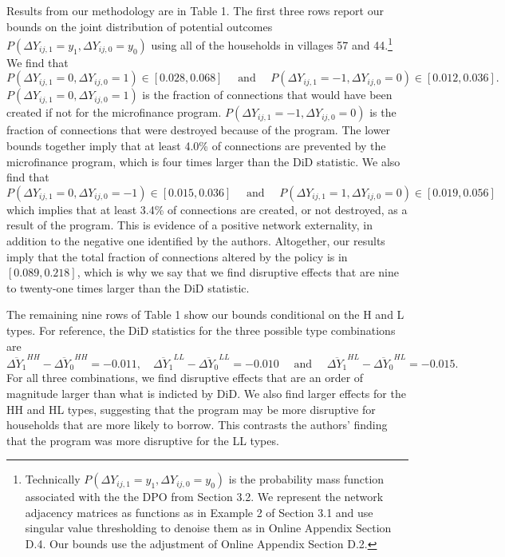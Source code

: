 \documentclass[12pt]{article}
\theoremstyle{definition}
\begin{document}
Results from our methodology are in Table 1. The first three rows report our bounds on the joint distribution of potential outcomes $P(\Delta Y_{ij,1} = y_1, \Delta Y_{ij,0} = y_0)$ using all of the households in villages 57 and 44.\footnote{Technically $P(\Delta Y_{ij,1} = y_1, \Delta Y_{ij,0} = y_0)$ is the probability mass function associated with the the DPO from Section 3.2. We represent the network adjacency matrices as functions as in Example 2 of Section 3.1 and use singular value thresholding to denoise them as in Online Appendix Section D.4. Our bounds use the adjustment of Online Appendix Section D.2.} We find that   $$P(\Delta Y_{ij,1} = 0, \Delta Y_{ij,0} = 1) \in [0.028, 0.068] \quad \text{ and } \quad P(\Delta Y_{ij,1} = -1, \Delta Y_{ij,0} = 0) \in [0.012, 0.036].$$ $P(\Delta Y_{ij,1} = 0, \Delta Y_{ij,0} = 1)$ is the fraction of connections that would have been created if not for the microfinance program. $P(\Delta Y_{ij,1} = -1, \Delta Y_{ij,0} = 0)$ is the fraction of connections that were destroyed because of the program. The lower bounds together imply that at least 4.0\% of connections are prevented by the microfinance program, which is four times larger than the DiD statistic. We also find that $$P(\Delta Y_{ij,1} = 0, \Delta Y_{ij,0} = -1) \in [0.015, 0.036] \quad \text{ and } \quad P(\Delta Y_{ij,1} = 1, \Delta Y_{ij,0} = 0) \in [0.019, 0.056]$$ which implies that at least 3.4\% of connections are created, or not destroyed, as a result of the program. This is evidence of a positive network externality, in addition to the negative one identified by the authors.  Altogether, our results imply that the total fraction of connections altered by the policy is in $[0.089,0.218]$, which is why we say that we find disruptive effects that are nine to twenty-one times larger than the DiD statistic.  

The remaining nine rows of Table 1 show our bounds conditional on the H and L types. For reference, the DiD statistics for the three possible type combinations are  
\begin{equation*}
	\overline{\Delta Y_{1}}^{HH}-\overline{\Delta Y_{0}}^{HH} = -0.011 , \quad \overline{\Delta Y_{1}}^{LL}-\overline{\Delta Y_{0}}^{LL} = -0.010 \quad \text{ and } \quad \overline{\Delta Y_{1}}^{HL}-\overline{\Delta Y_{0}}^{HL} = -0.015.
\end{equation*}
For all three combinations, we find disruptive effects that are an order of magnitude larger than what is indicted by DiD. We also find larger effects for the HH and HL types, suggesting that the program may be more disruptive for households that are more likely to borrow. This contrasts the authors' finding that the program was more disruptive for the LL types.   
\end{document}
